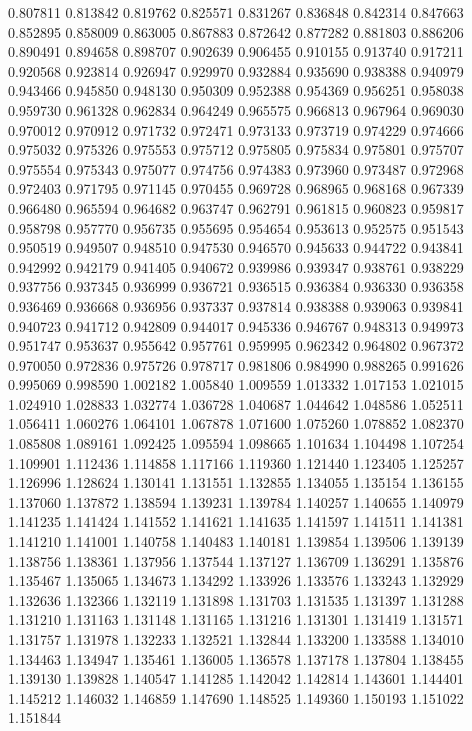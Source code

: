 0.807811
0.813842
0.819762
0.825571
0.831267
0.836848
0.842314
0.847663
0.852895
0.858009
0.863005
0.867883
0.872642
0.877282
0.881803
0.886206
0.890491
0.894658
0.898707
0.902639
0.906455
0.910155
0.913740
0.917211
0.920568
0.923814
0.926947
0.929970
0.932884
0.935690
0.938388
0.940979
0.943466
0.945850
0.948130
0.950309
0.952388
0.954369
0.956251
0.958038
0.959730
0.961328
0.962834
0.964249
0.965575
0.966813
0.967964
0.969030
0.970012
0.970912
0.971732
0.972471
0.973133
0.973719
0.974229
0.974666
0.975032
0.975326
0.975553
0.975712
0.975805
0.975834
0.975801
0.975707
0.975554
0.975343
0.975077
0.974756
0.974383
0.973960
0.973487
0.972968
0.972403
0.971795
0.971145
0.970455
0.969728
0.968965
0.968168
0.967339
0.966480
0.965594
0.964682
0.963747
0.962791
0.961815
0.960823
0.959817
0.958798
0.957770
0.956735
0.955695
0.954654
0.953613
0.952575
0.951543
0.950519
0.949507
0.948510
0.947530
0.946570
0.945633
0.944722
0.943841
0.942992
0.942179
0.941405
0.940672
0.939986
0.939347
0.938761
0.938229
0.937756
0.937345
0.936999
0.936721
0.936515
0.936384
0.936330
0.936358
0.936469
0.936668
0.936956
0.937337
0.937814
0.938388
0.939063
0.939841
0.940723
0.941712
0.942809
0.944017
0.945336
0.946767
0.948313
0.949973
0.951747
0.953637
0.955642
0.957761
0.959995
0.962342
0.964802
0.967372
0.970050
0.972836
0.975726
0.978717
0.981806
0.984990
0.988265
0.991626
0.995069
0.998590
1.002182
1.005840
1.009559
1.013332
1.017153
1.021015
1.024910
1.028833
1.032774
1.036728
1.040687
1.044642
1.048586
1.052511
1.056411
1.060276
1.064101
1.067878
1.071600
1.075260
1.078852
1.082370
1.085808
1.089161
1.092425
1.095594
1.098665
1.101634
1.104498
1.107254
1.109901
1.112436
1.114858
1.117166
1.119360
1.121440
1.123405
1.125257
1.126996
1.128624
1.130141
1.131551
1.132855
1.134055
1.135154
1.136155
1.137060
1.137872
1.138594
1.139231
1.139784
1.140257
1.140655
1.140979
1.141235
1.141424
1.141552
1.141621
1.141635
1.141597
1.141511
1.141381
1.141210
1.141001
1.140758
1.140483
1.140181
1.139854
1.139506
1.139139
1.138756
1.138361
1.137956
1.137544
1.137127
1.136709
1.136291
1.135876
1.135467
1.135065
1.134673
1.134292
1.133926
1.133576
1.133243
1.132929
1.132636
1.132366
1.132119
1.131898
1.131703
1.131535
1.131397
1.131288
1.131210
1.131163
1.131148
1.131165
1.131216
1.131301
1.131419
1.131571
1.131757
1.131978
1.132233
1.132521
1.132844
1.133200
1.133588
1.134010
1.134463
1.134947
1.135461
1.136005
1.136578
1.137178
1.137804
1.138455
1.139130
1.139828
1.140547
1.141285
1.142042
1.142814
1.143601
1.144401
1.145212
1.146032
1.146859
1.147690
1.148525
1.149360
1.150193
1.151022
1.151844
